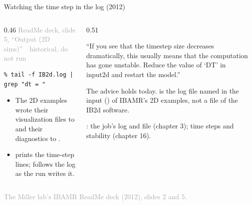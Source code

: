 \documentclass[aspectratio=169,11pt]{beamer}
\newcommand{\sourcecredit}[1]{\vfill\begin{flushright}\tiny\textcolor{DarkGray}{#1}\end{flushright}}
\newcommand{\hist}[1]{{\tiny\sffamily\textcolor{DarkGray}{#1\ \textbullet\ historical, do not run}}\par\nointerlineskip\vspace{0.3mm}}
\begin{document}
\begin{frame}[fragile]{Watching the time step in the log (2012)}
\label{fr:dtlog}
\begin{columns}[T,onlytextwidth]
\begin{column}{0.46\textwidth}
\hist{ReadMe deck, slide 5, ``Output (2D sims)''}
\begin{lstlisting}[style=hist]
% grep "dt = " IB2d.log
% tail -f IB2d.log | grep "dt = "
\end{lstlisting}
\small
\begin{itemize}\setlength{\itemsep}{3pt}
  \item The 2D examples wrote their visualization files to  and their diagnostics to .
  \item {} prints the time-step lines;  follows the log as the run writes it.
\end{itemize}
\end{column}
\begin{column}{0.51\textwidth}
\begin{homebox}
\footnotesize ``If you see that the timestep size decreases dramatically, this usually means that the computation has gone unstable. Reduce the value of `DT' in input2d and restart the model.''
\end{homebox}
\vspace{2mm}
\footnotesize The advice holds today.  is the log file named in the input () of IBAMR's 2D examples, not a file of the IB2d software.

\vspace{1mm}
: the job's log and  file (chapter 3); time steps and stability (chapter 16).
\end{column}
\end{columns}
\sourcecredit{The Miller lab's IBAMR ReadMe deck (2012), slides 2 and 5.}
\end{frame}
\end{document}
